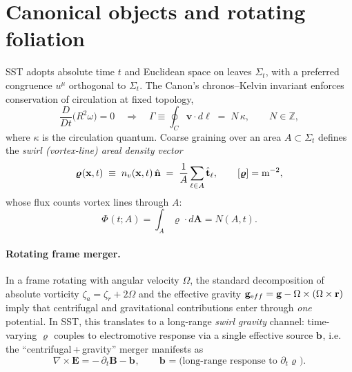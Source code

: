 \documentclass[10pt,reprint,aps,onecolumn,nofootinbib]{revtex4-2}
\def\boldsymbol#1{#1}%
\def\mathcal#1{#1}%
\def\!{}%
\def\swirlarrow{}%
\DeclareRobustCommand{\swirlarrow}{%
    \mathchoice{\mkern-2mu\scriptstyle\boldsymbol{\circlearrowleft}}%
    {\mkern-2mu\scriptstyle\boldsymbol{\circlearrowleft}}%
    {\mkern-2mu\scriptscriptstyle\boldsymbol{\circlearrowleft}}%
    {\mkern-2mu\scriptscriptstyle\boldsymbol{\circlearrowleft}}%
}
\begin{document}
\section{Canonical objects and rotating foliation}
    SST adopts absolute time $t$ and Euclidean space on leaves $\Sigma_t$, with a preferred congruence $u^\mu$ orthogonal to $\Sigma_t$. The Canon’s chronos--Kelvin invariant enforces conservation of circulation at fixed topology,
    \begin{equation}
    \frac{D}{Dt}\Big(R^2\omega\Big)=0
    \quad\Longrightarrow\quad
    \Gamma\equiv\oint_{\mathcal C}\mathbf v\!\cdot d\boldsymbol\ell \;=\; N\,\kappa,\qquad N\in\mathbb Z,
    \label{eq:Kelvin}
    \end{equation}
    where $\kappa$ is the circulation quantum. Coarse graining over an area $A\subset\Sigma_t$ defines the \emph{swirl (vortex-line) areal density vector}
    \begin{equation}
    \bm{\varrho}_{\swirlarrow}(\mathbf x,t) \;\equiv\; n_v(\mathbf x,t)\,\hat{\mathbf n} \;=\; \frac{1}{A}\sum_{\ell\in A}\hat{\mathbf t}_\ell,
    \qquad [\bm{\varrho}]={\textrm m^{-2}},
    \label{eq:rho_def}
    \end{equation}
    whose flux counts vortex lines through $A$:
    \begin{equation}
    \Phi_{\swirlarrow}(t;A)=\int_A \bm{\varrho}_{\swirlarrow}\!\cdot d\mathbf A = N(A,t).
    \label{eq:swflux}
    \end{equation}

    \paragraph{Rotating frame merger.}
        In a frame rotating with angular velocity $\boldsymbol\Omega$, the standard decomposition of absolute vorticity $\boldsymbol\zeta_a=\boldsymbol\zeta_r+2\boldsymbol\Omega$ and the effective gravity $\mathbf g_{\textrm eff}=\mathbf g-\boldsymbol\Omega\times(\boldsymbol\Omega\times\mathbf r)$ imply that centrifugal and gravitational contributions enter through \emph{one} potential. In SST, this translates to a long-range \emph{swirl gravity} channel: time-varying $\bm{\varrho}_{\swirlarrow}$ couples to electromotive response via a single effective source $\mathbf b_{\swirlarrow}$, i.e. the ``centrifugal\,+\,gravity'' merger manifests as
        \begin{equation}
        \nabla\times\mathbf E = -\,\partial_t\mathbf B - \mathbf b_{\swirlarrow},
        \qquad \mathbf b_{\swirlarrow}=\text{(long-range response to }\partial_t \bm{\varrho}_{\swirlarrow}\text{)}.
        \label{eq:Faraday_mod}
        \end{equation}
\end{document}
